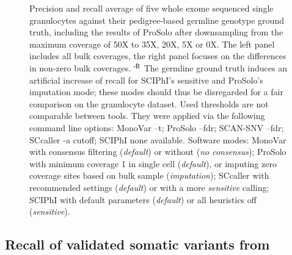\documentclass[authoryear,preprint,11pt]{scrartcl}
\begin{document}
\begin{figure}[!tpb]
\begin{minipage}[t]{.58\linewidth}
 \end{minipage}\newline
 \caption{
  Precision and recall average of five whole exome sequenced single granulocytes against their pedigree-based germline genotype ground truth, including the results of ProSolo after downsampling from the maximum coverage of 50X to 35X, 20X, 5X or 0X.
  The left panel includes all bulk coverages, the right panel focuses on the differences in non-zero bulk coverages.\newline 
  $^\text{\sffamily-B}$ The germline ground truth induces an artificial increase of recall for SCIPhI's sensitive and ProSolo's imputation mode; these modes should thus be disregarded for a fair comparison on the granulocyte dataset.\newline \footnotesize
  Used thresholds are not comparable between tools.
  They were applied via the following command line options:
  MonoVar {\ttfamily --t};
  ProSolo {\ttfamily --fdr};
  SCAN-SNV {\ttfamily --fdr};
  SCcaller {\ttfamily -a cutoff};
  SCIPhI {\ttfamily none available}.
  Software modes:
  MonoVar with consensus filtering ({\itshape default}) or without ({\itshape no consensus});
  ProSolo with minimum coverage 1 in single cell ({\itshape default}), or imputing zero coverage sites based on bulk sample ({\itshape imputation});
  SCcaller with recommended settings ({\itshape default}) or with a more {\itshape sensitive} calling;
  SCIPhI with default parameters ({\itshape default}) or all heuristics off ({\itshape sensitive}).
  }
 \label{fig:downsampling}
\end{figure}


\subsection{Recall of validated somatic variants from \cite{wang_clonal_2014}} \label{sec:somatic-recall}
\end{document}
